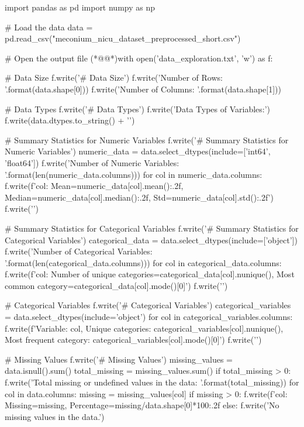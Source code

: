 \documentclass[11pt]{article}
\begin{document}
\begin{python}

import pandas as pd
import numpy as np

# Load the data
data = pd.read_csv("meconium_nicu_dataset_preprocessed_short.csv")

# Open the output file
(*@@*)with open('data_exploration.txt', 'w') as f:

    # Data Size
    f.write('# Data Size\n')
    f.write('Number of Rows: {}\n'.format(data.shape[0]))
    f.write('Number of Columns: {}\n\n'.format(data.shape[1]))
    
    # Data Types
    f.write('# Data Types\n')
    f.write('Data Types of Variables:\n')
    f.write(data.dtypes.to_string() + '\n\n')

    # Summary Statistics for Numeric Variables
    f.write('# Summary Statistics for Numeric Variables\n')
    numeric_data = data.select_dtypes(include=['int64', 'float64'])
    f.write('Number of Numeric Variables: {}\n'.format(len(numeric_data.columns)))
    for col in numeric_data.columns:
        f.write(f'{col}: Mean={numeric_data[col].mean():.2f}, Median={numeric_data[col].median():.2f}, Std={numeric_data[col].std():.2f}\n')
    f.write('\n')

    # Summary Statistics for Categorical Variables
    f.write('# Summary Statistics for Categorical Variables\n')
    categorical_data = data.select_dtypes(include=['object'])
    f.write('Number of Categorical Variables: {}\n'.format(len(categorical_data.columns)))
    for col in categorical_data.columns:
        f.write(f'{col}: Number of unique categories={categorical_data[col].nunique()}, Most common category={categorical_data[col].mode()[0]}\n')
    f.write('\n')
     
    # Categorical Variables
    f.write('# Categorical Variables\n')
    categorical_variables = data.select_dtypes(include='object')
    for col in categorical_variables.columns:
        f.write(f'Variable: {col}, Unique categories: {categorical_variables[col].nunique()}, Most frequent category: {categorical_variables[col].mode()[0]}\n')
    f.write('\n')
    
    # Missing Values
    f.write('# Missing Values\n')
    missing_values = data.isnull().sum()
    total_missing = missing_values.sum()
    if total_missing > 0:
        f.write('Total missing or undefined values in the data: {}\n'.format(total_missing))
        for col in data.columns:
            missing = missing_values[col]
            if missing > 0:
                f.write(f'{col}: Missing={missing}, Percentage={missing/data.shape[0]*100:.2f}%
    else:
        f.write('No missing values in the data.\n')


\end{python}
\end{document}
